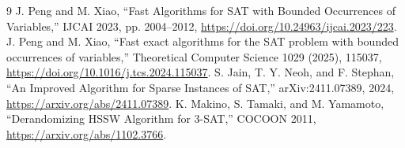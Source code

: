 \documentclass[11pt]{article}
\begin{document}
\begin{thebibliography}{9}
 J. Peng and M. Xiao, ``Fast Algorithms for SAT with Bounded Occurrences of Variables,'' IJCAI 2023, pp. 2004--2012, \url{https://doi.org/10.24963/ijcai.2023/223}.
 J. Peng and M. Xiao, ``Fast exact algorithms for the SAT problem with bounded occurrences of variables,'' Theoretical Computer Science 1029 (2025), 115037, \url{https://doi.org/10.1016/j.tcs.2024.115037}.
 S. Jain, T. Y. Neoh, and F. Stephan, ``An Improved Algorithm for Sparse Instances of SAT,'' arXiv:2411.07389, 2024, \url{https://arxiv.org/abs/2411.07389}.
 K. Makino, S. Tamaki, and M. Yamamoto, ``Derandomizing HSSW Algorithm for 3-SAT,'' COCOON 2011, \url{https://arxiv.org/abs/1102.3766}.
\end{thebibliography}
\end{document}
